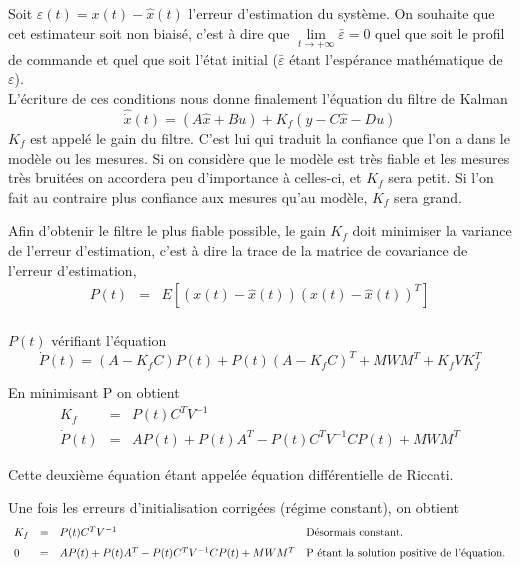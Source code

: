 \documentclass[12pt,twoside,a4paper]{article}
\begin{document}
\noindent Soit $\varepsilon(t)= x(t)-\hat x(t)$ l'erreur d'estimation du système. On souhaite que cet estimateur soit non biaisé, c'est à dire que $\lim\limits_{t \rightarrow +\infty } \bar{\varepsilon}= 0 $ quel que soit le profil de commande et quel que soit l'état initial ($\bar{\varepsilon}$ étant l'espérance mathématique de $\varepsilon$).
\vspace{0.5cm}\\
L'écriture de ces conditions nous donne finalement l'équation du filtre de Kalman
$$
\hat{\dot{x}}(t) = (A\hat x + Bu) + K_f (y -C \hat x -Du)
$$
$K_f$ est appelé le gain du filtre. C'est lui qui traduit la confiance que l'on a dans le modèle ou les mesures. Si on considère que le modèle est très fiable et les mesures très bruitées on accordera peu d'importance à celles-ci, et $K_f$ sera petit. Si l'on fait au contraire plus confiance aux mesures qu'au modèle, $K_f$ sera grand.
\vspace{1cm}

Afin d'obtenir le filtre le plus fiable possible, le gain $K_f$ doit minimiser la variance de l'erreur d'estimation, c'est à dire la trace de la matrice de covariance de l'erreur d'estimation,
$$
\begin{array}{lll}
P(t) &=& E[(x(t)-\hat x(t))(x(t)-\hat x(t))^T] \\
\end{array}
$$

$P(t)$ vérifiant l'équation
$$
\dot{P}(t) = (A-K_{f}C)P(t)+P(t)(A-K_{f}C)^{T} + MWM^{T} + K_{f}VK_{f}^{T}
$$

En minimisant P on obtient
$$
\begin{array}{lll}
K_f &=& P(t)C^T V^{-1} \\
\dot{P}(t) &= &AP(t) +P(t)A^T -P(t)C^TV^{-1}CP(t)+MWM^T
\end{array}
$$

Cette deuxième équation étant appelée équation différentielle de Riccati.
\vspace{1cm}

Une fois les erreurs d'initialisation corrigées (régime constant), on obtient
$$
\begin{array}{llll}
K_f &=& P(t)C^T V^{-1} &\text{Désormais constant.}\\
0 &= &AP(t) +P(t)A^T -P(t)C^TV^{-1}CP(t)+MWM^T & \text{P étant la solution positive de l'équation.}
\rule[0pt]{0mm}{15pt} \\
\end{array}
$$
\end{document}
